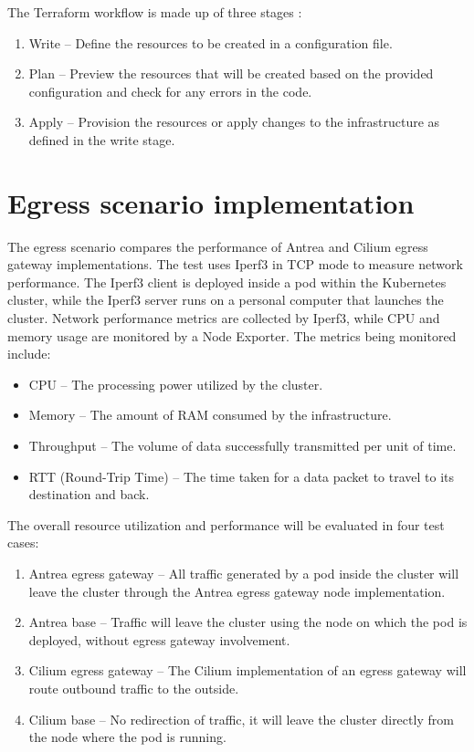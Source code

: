 The Terraform workflow is made up of three stages \cite{Terraform}:
\begin{enumerate}
  \item Write -- Define the resources to be created in a configuration file.
  \item Plan -- Preview the resources that will be created based on the provided configuration and check for any errors in the code.
  \item Apply -- Provision the resources or apply changes to the infrastructure as defined in the write stage.
\end{enumerate}





\section{Egress scenario implementation}
\label{sec:egressImpl}


The egress scenario compares the performance of Antrea and Cilium egress gateway implementations. The test uses Iperf3 in TCP mode to measure network performance. The Iperf3 client is deployed inside a pod within the Kubernetes cluster, while the Iperf3 server runs on a personal computer that launches the cluster. Network performance metrics are collected by Iperf3, while CPU and memory usage are monitored by a Node Exporter. The metrics being monitored include:
\begin{itemize}
  \item CPU -- The processing power utilized by the cluster.
  \item Memory -- The amount of RAM consumed by the infrastructure.
  \item Throughput -- The volume of data successfully transmitted per unit of time.
  \item RTT (Round-Trip Time) -- The time taken for a data packet to travel to its destination and back.
\end{itemize}

The overall resource utilization and performance will be evaluated in four test cases:

\begin{enumerate}
  \item Antrea egress gateway -- All traffic generated by a pod inside the cluster will leave the cluster through the Antrea egress gateway node implementation.
  \item Antrea base -- Traffic will leave the cluster using the node on which the pod is deployed, without egress gateway involvement.
  \item Cilium egress gateway -- The Cilium implementation of an egress gateway will route outbound traffic to the outside.
  \item Cilium base -- No redirection of traffic, it will leave the cluster directly from the node where the pod is running.
\end{enumerate}

